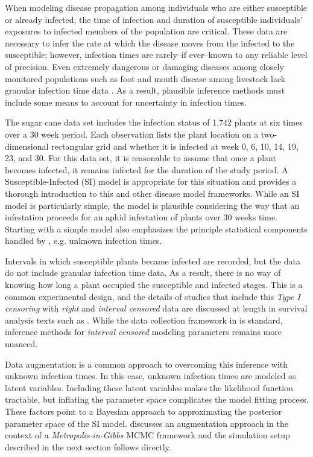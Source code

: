 \documentclass{uwstat572}
\begin{document}
When modeling disease propagation among individuals who are either susceptible or already infected, the time of infection and duration of susceptible individuals' exposures to infected members of the population are critical. 
These data are necessary to infer the rate at which the disease moves from the infected to the susceptible; however, infection times are rarely--if ever--known to any reliable level of precision. 
Even extremely dangerous or damaging diseases among closely monitored populations such as foot and mouth disease among livestock lack granular infection time data \citep{Diggle, Deardon}. 
As a result, plausible inference methods must include some means to account for uncertainty in infection times. 

The sugar cane data set includes the infection status of 1,742 plants at six times over a 30 week period. 
Each observation lists the plant location on a two-dimensional rectangular grid and whether it is infected at week 0, 6, 10, 14, 19, 23, and 30.
For this data set, it is reasonable to assume that once a plant becomes infected, it remains infected for the duration of the study period. 
A Susceptible-Infected (SI) model is appropriate for this situation and \citet{Jewell} provides a thorough introduction to this and other disease model frameworks. 
While an SI model is particularly simple, the model is plausible considering the way that an infestation proceeds for an aphid infestation of plants over 30 weeks time. 
Starting with a simple model also emphasizes the principle statistical components handled by \citet{Brown}, e.g. unknown infection times. 

Intervals in which susceptible plants became infected are recorded, but the data do not include granular infection time data.  
As a result, there is no way of knowing how long a plant occupied the susceptible and infected stages.
This is a common experimental design, and the details of studies that include this \textit{Type I censoring} with \textit{right} and \textit{interval censored} data are discussed at length in survival analysis texts such as \citet{Klein}. 
While the data collection framework in \citet{Brown} is standard, inference methods for \textit{interval censored} modeling parameters remains more nuanced.

Data augmentation is a common approach to overcoming this inference with unknown infection times. 
In this case, unknown infection times are modeled as latent variables. 
Including these latent variables makes the likelihood function tractable, but inflating the parameter space complicates the model fitting process. 
These factors point to a Bayesian approach to approximating the posterior parameter space of the SI model. 
\citet{Jewell} discusses an augmentation approach in the context of a \textit{Metropolis-in-Gibbs} MCMC framework and the simulation setup described in the next section follows directly. 
\end{document}
